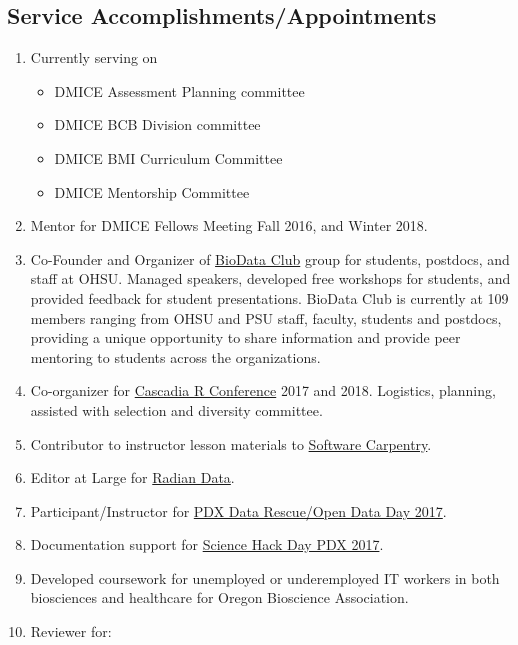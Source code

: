 \documentclass[11pt,]{article}
\providecommand{\tightlist}{%
  \setlength{\itemsep}{0pt}\setlength{\parskip}{0pt}}
\begin{document}
\subsection{Service
Accomplishments/Appointments}\label{service-accomplishmentsappointments}

\begin{enumerate}
\def\labelenumi{\arabic{enumi}.}
\item
  Currently serving on

  \begin{itemize}
  \tightlist
  \item
    DMICE Assessment Planning committee
  \item
    DMICE BCB Division committee
  \item
    DMICE BMI Curriculum Committee
  \item
    DMICE Mentorship Committee
  \end{itemize}
\item
  Mentor for DMICE Fellows Meeting Fall 2016, and Winter 2018.
\item
  Co-Founder and Organizer of
  \href{https://biodata-club.github.io}{BioData Club} group for
  students, postdocs, and staff at OHSU. Managed speakers, developed
  free workshops for students, and provided feedback for student
  presentations. BioData Club is currently at 109 members ranging from
  OHSU and PSU staff, faculty, students and postdocs, providing a unique
  opportunity to share information and provide peer mentoring to
  students across the organizations.
\item
  Co-organizer for \href{https://cascadiarconf.com}{Cascadia R
  Conference} 2017 and 2018. Logistics, planning, assisted with
  selection and diversity committee.
\item
  Contributor to instructor lesson materials to
  \href{https://software-carpentry.org}{Software Carpentry}.
\item
  Editor at Large for \href{http://radiandata.org/}{Radian Data}.
\item
  Participant/Instructor for
  \href{https://github.com/daniellecrobinson/Data-Rescue-PDX}{PDX Data
  Rescue/Open Data Day 2017}.
\item
  Documentation support for
  \href{http://portland.sciencehackday.org}{Science Hack Day PDX 2017}.
\item
  Developed coursework for unemployed or underemployed IT workers in
  both biosciences and healthcare for Oregon Bioscience Association.
\item
  Reviewer for:


\end{enumerate}
\end{document}
